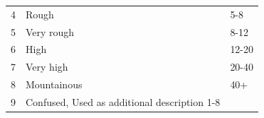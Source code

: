 \documentclass[
]{book}
\begin{document}
\begin{longtable}[]{@{}lll@{}}
\begin{minipage}[t]{0.08\columnwidth}\raggedright
4\strut
\end{minipage} & \begin{minipage}[t]{0.56\columnwidth}\raggedright
Rough\strut
\end{minipage} & \begin{minipage}[t]{0.27\columnwidth}\raggedright
5-8\strut
\end{minipage}\tabularnewline
\begin{minipage}[t]{0.08\columnwidth}\raggedright
5\strut
\end{minipage} & \begin{minipage}[t]{0.56\columnwidth}\raggedright
Very rough\strut
\end{minipage} & \begin{minipage}[t]{0.27\columnwidth}\raggedright
8-12\strut
\end{minipage}\tabularnewline
\begin{minipage}[t]{0.08\columnwidth}\raggedright
6\strut
\end{minipage} & \begin{minipage}[t]{0.56\columnwidth}\raggedright
High\strut
\end{minipage} & \begin{minipage}[t]{0.27\columnwidth}\raggedright
12-20\strut
\end{minipage}\tabularnewline
\begin{minipage}[t]{0.08\columnwidth}\raggedright
7\strut
\end{minipage} & \begin{minipage}[t]{0.56\columnwidth}\raggedright
Very high\strut
\end{minipage} & \begin{minipage}[t]{0.27\columnwidth}\raggedright
20-40\strut
\end{minipage}\tabularnewline
\begin{minipage}[t]{0.08\columnwidth}\raggedright
8\strut
\end{minipage} & \begin{minipage}[t]{0.56\columnwidth}\raggedright
Mountainous\strut
\end{minipage} & \begin{minipage}[t]{0.27\columnwidth}\raggedright
40+\strut
\end{minipage}\tabularnewline
\begin{minipage}[t]{0.08\columnwidth}\raggedright
9\strut
\end{minipage} & \begin{minipage}[t]{0.56\columnwidth}\raggedright
Confused, Used as additional description 1-8\strut
\end{minipage} & \begin{minipage}[t]{0.27\columnwidth}\raggedright
\strut
\end{minipage}\tabularnewline
\bottomrule
\end{longtable}
\end{document}
